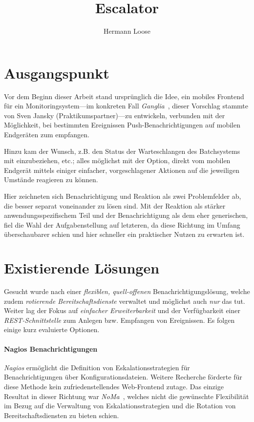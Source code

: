 \documentclass[11pt,utf8,notoc,bibnum,german,final]{zihpub}
\title{Escalator}
\author{Hermann Loose}
\begin{document}
\section{Ausgangspunkt}

Vor dem Beginn dieser Arbeit stand ursprünglich die Idee, ein mobiles Frontend
für ein Monitoringsystem—im konkreten Fall \emph{Ganglia}~\cite{ganglia},
dieser Vorschlag stammte von Sven Jansky (Praktikumspartner)—zu
entwickeln, verbunden mit der Möglichkeit, bei bestimmten Ereignissen
Push-Benach\-richti\-gungen auf mobilen Endgeräten zum empfangen.

Hinzu kam der Wunsch, z.B. den Status der Warteschlangen des Batchsystems mit
einzubeziehen, etc.; alles möglichst mit der Option, direkt vom mobilen
Endgerät mittels einiger einfacher, vorgeschlagener Aktionen auf die jeweiligen
Umstände reagieren zu können.

Hier zeichneten sich Benachrichtigung und Reaktion als zwei Problemfelder ab,
die besser separat voneinander zu lösen sind. Mit der Reaktion als stärker
anwendungsspezifischem Teil und der Benachrichtigung als dem eher generischen,
fiel die Wahl der Aufgabenstellung auf letzteren, da diese Richtung im Umfang
überschaubarer schien und hier schneller ein praktischer Nutzen zu erwarten
ist.

\section{Existierende Lösungen}

Gesucht wurde nach einer \emph{flexiblen, quell-offenen}
Benachrichtigungslösung, welche zudem \emph{rotierende Bereitschaftsdienste}
verwaltet und möglichst auch \emph{nur} das tut. Weiter lag der Fokus auf
\emph{einfacher Erweiterbarkeit} und der Verfügbarkeit einer
\emph{REST-Schnittstelle} zum Anlegen bzw. Empfangen von Ereignissen. Es folgen
einige kurz evaluierte Optionen.

\paragraph{Nagios Benachrichtigungen~\cite{nagios-notifications}}

\emph{Nagios} ermöglicht die Definition von Eskalationsstrategien für
Benachrichtigungen über Konfigurationsdateien. Weitere Recherche förderte für
diese Methode kein zufriedenstellendes Web-Frontend zutage. Das einzige
Resultat in dieser Richtung war \emph{NoMa}~\cite{noma}, welches nicht die gewünschte
Flexibilität im Bezug auf die Verwaltung von Eskalationsstrategien und die
Rotation von Bereitschaftsdiensten zu bieten schien.
\end{document}
